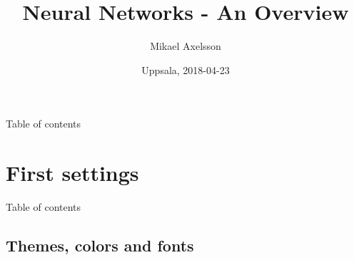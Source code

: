 \documentclass{beamer}
\begin{document}

\author[Mikael]{Mikael Axelsson}
\title[Neural Networks]{Neural Networks - An Overview}
\date{Uppsala, 2018-04-23}
\frame{\titlepage}


\begin{frame}{Table of contents}
\tableofcontents
\end{frame}


\section{First settings}

\begin{frame}{Table of contents}
\end{frame}


\subsection[Themes]{Themes, colors and fonts}
\end{document}
